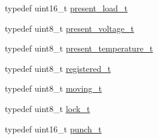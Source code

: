 \begin{DoxyCompactItemize}
\item 
typedef uint16\+\_\+t \hyperlink{structdynamixel_1_1servos_1_1_model_traits_3_01_ax12_w_01_4_1_1_c_t_a4602f3f2a9eeeda20efe0878d914c2fa}{present\+\_\+load\+\_\+t}
\item 
typedef uint8\+\_\+t \hyperlink{structdynamixel_1_1servos_1_1_model_traits_3_01_ax12_w_01_4_1_1_c_t_a22d20cebaea08b940a4d46bba3488dae}{present\+\_\+voltage\+\_\+t}
\item 
typedef uint8\+\_\+t \hyperlink{structdynamixel_1_1servos_1_1_model_traits_3_01_ax12_w_01_4_1_1_c_t_ab74f6e1006caeb482b82aa57f13eddea}{present\+\_\+temperature\+\_\+t}
\item 
typedef uint8\+\_\+t \hyperlink{structdynamixel_1_1servos_1_1_model_traits_3_01_ax12_w_01_4_1_1_c_t_ac20fb93d98036da8d1f152c8b0f7d4c3}{registered\+\_\+t}
\item 
typedef uint8\+\_\+t \hyperlink{structdynamixel_1_1servos_1_1_model_traits_3_01_ax12_w_01_4_1_1_c_t_a7af753151e0c1904c8ffa8bca21e3d46}{moving\+\_\+t}
\item 
typedef uint8\+\_\+t \hyperlink{structdynamixel_1_1servos_1_1_model_traits_3_01_ax12_w_01_4_1_1_c_t_a0ec512453b5f8e0f60b6c787659614b0}{lock\+\_\+t}
\item 
typedef uint16\+\_\+t \hyperlink{structdynamixel_1_1servos_1_1_model_traits_3_01_ax12_w_01_4_1_1_c_t_a3d4a415b50c5fae4de6cbd068fd140ab}{punch\+\_\+t}
\end{DoxyCompactItemize}
